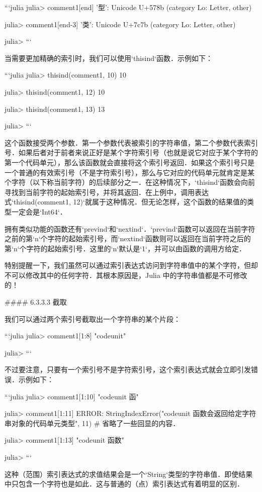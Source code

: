 ```julia
julia> comment1[end]
'型': Unicode U+578b (category Lo: Letter, other)

julia> comment1[end-3]
'类': Unicode U+7c7b (category Lo: Letter, other)

julia> 
```

当需要更加精确的索引时，我们可以使用`thisind`函数．示例如下：

```julia
julia> thisind(comment1, 10)
10

julia> thisind(comment1, 12)
10

julia> thisind(comment1, 13)
13

julia> 
```

这个函数接受两个参数．第一个参数代表被索引的字符串值，第二个参数代表索引号．如果后者对于前者来说正好是某个字符索引号（也就是说它对应于某个字符的第一个代码单元），那么该函数就会直接将这个索引号返回．如果这个索引号只是一个普通的有效索引号（不是字符索引号），那么与它对应的代码单元就肯定是某个字符（以下称当前字符）的后续部分之一．在这种情况下，`thisind`函数会向前寻找到当前字符的起始索引号，并将其返回．在上例中，调用表达式`thisind(comment1, 12)`就属于这种情况．但无论怎样，这个函数的结果值的类型一定会是`Int64`．

拥有类似功能的函数还有`prevind`和`nextind`．`prevind`函数可以返回在当前字符之前的第`n`个字符的起始索引号，而`nextind`函数则可以返回在当前字符之后的第`n`个字符的起始索引号．这里的`n`默认是`1`，并可以由函数的调用方给定．

特别提醒一下，我们虽然可以通过索引表达式访问到字符串值中的某个字符，但却不可以修改其中的任何字符．其根本原因是，Julia 中的字符串值都是不可修改的！

#### 6.3.3.3 截取

我们可以通过两个索引号截取出一个字符串的某个片段：

```julia
julia> comment1[1:8]
"codeunit"

julia> 
```

不过要注意，只要有一个索引号不是字符索引号，这个索引表达式就会立即引发错误．示例如下：

```julia
julia> comment1[1:10]
"codeunit 函"

julia> comment1[1:11]
ERROR: StringIndexError("codeunit 函数会返回给定字符串对象的代码单元类型", 11)
# 省略了一些回显的内容．

julia> comment1[1:13]
"codeunit 函数"

julia> 
```

这种（范围）索引表达式的求值结果会是一个`String`类型的字符串值．即使结果中只包含一个字符也是如此．这与普通的（点）索引表达式有着明显的区别．

